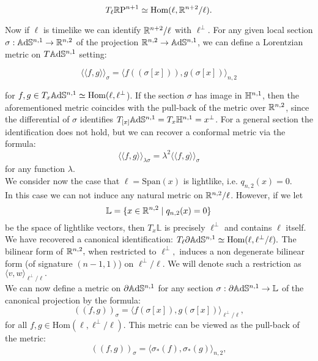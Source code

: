 \[
    T_{\ell}\mathbb{R}\text{P}^{n+1}\simeq \text{Hom}(\ell,\mathbb{R}^{n+2}/\ell). 
\]

Now if $\ell$ is timelike we can identify $\mathbb{R}^{n+2}/\ell$ with $\ell^{\perp}.$ For any given local section $\sigma:\mathbb{A}\mathrm{d}\mathbb{S}^{n,1}\to \mathbb{R}^{n,2}$ of the projection $\mathbb{R}^{n,2}\to \mathbb{A}\mathrm{d}\mathbb{S}^{n,1}$, we can define a Lorentzian metric on $T\mathbb{A}\mathrm{d}\mathbb{S}^{n,1}$ setting:

\[
    \langle \langle f,g \rangle \rangle_{\sigma}=\langle f((\sigma[x])),g(\sigma[x])\rangle_{n,2}
\]

for $f,g\in T_{x}\mathbb{A}\mathrm{d}\mathbb{S}^{n,1}\simeq \text{Hom}(\ell,\ell^\perp$). If the section $\sigma$ has image in $\mathbb{H}^{n,1}$, then the aforementioned metric coincides with the pull-back of the metric over $\mathbb{R}^{n,2}$, since the differential of $\sigma $ identifies $T_{[x]}\mathbb{A}\mathrm{d}\mathbb{S}^{n,1}=T_x\mathbb{H}^{n,1}=x^\perp$. For a general section the identification does not hold, but we can recover a conformal metric via the formula: 
\begin{equation}\label{23}
    \langle \langle f,g \rangle \rangle_{\lambda\sigma}=\lambda^2\langle \langle f,g \rangle \rangle_{\sigma}
\end{equation}
for any function $\lambda$.\\
We consider now the case that $\ell=\text{Span}(x)$ is lightlike, i.e. $q_{n,2}(x)=0$. \\In this case we can not induce any natural metric on $\mathbb{R}^{n,2}/\ell$. However, if we let 
\[
    \mathbb{L}=\{x\in \mathbb{R}^{n,2}\;|\;q_{n,2}(x)=0\}
\]
be the space of lightlike vectors, then $T_x\mathbb{L}$ is precisely $\ell^{\perp}$ and contains $\ell$ itself. We have recovered a canonical identification: $T_\ell\partial\mathbb{A}\mathrm{d}\mathbb{S}^{n,1}\simeq\text{Hom}(\ell,\ell^{\perp }/\ell).$ The bilinear form of $\mathbb{R}^{n,2},$ when restricted to $\ell^{\perp},$ induces a non degenerate bilinear form (of signature $(n-1,1)$) on $\ell^\perp/\ell.$ We will denote such a restriction as $\langle v,w\rangle_{\ell^{\perp}/\ell}.$ \\
We can now define a metric on $\partial\mathbb{A}\mathrm{d}\mathbb{S}^{n,1}$ for any section $\sigma:\partial\mathbb{A}\mathrm{d}\mathbb{S}^{n,1}\to \mathbb{L}$ of the canonical projection by the formula:
\begin{equation}\label{24}
    ((f,g))_{\sigma}=\langle f(\sigma[x]),g(\sigma[x])\rangle_{\ell^{\perp}/\ell},
\end{equation}
for all $f,g\in \text{Hom}(\ell, \ell^\perp/\ell).$ This metric can be viewed as the pull-back of the metric: 
\begin{equation}\label{25}
    ((f,g))_\sigma=\langle \sigma_*(f), \sigma_{\ast} (g)\rangle_{n,2}, 
\end{equation}
